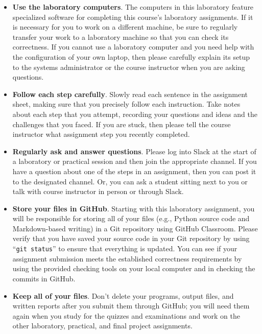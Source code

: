 \documentclass[11pt]{article}
\newcommand{\command}[1]{``\lstinline{#1}''}
\begin{document}
\begin{itemize}
  \setlength{\itemsep}{0pt}

\item {\bf Use the laboratory computers}. The computers in this laboratory feature specialized software for completing
  this course's laboratory  assignments. If it is necessary for you to work on a different machine, be sure to regularly
  transfer your work to a laboratory machine so that you can check its correctness. If you cannot use a laboratory
  computer and you need help with the configuration of your own laptop, then please carefully explain its setup to the
  systems administrator or the course instructor when you are asking questions.

\item {\bf Follow each step carefully}. Slowly read each sentence in the assignment sheet, making sure that you
  precisely follow each instruction. Take notes about each step that you attempt, recording your questions and ideas and
  the challenges that you faced. If you are stuck, then please tell the course instructor what assignment step you
  recently completed.

\item {\bf Regularly ask and answer questions}. Please log into Slack at the start of a laboratory or practical session
  and then join the appropriate channel. If you have a question about one of the steps in an assignment, then you can
  post it to the designated channel. Or, you can ask a student sitting next to you or talk with course instructor in
  person or through Slack.

\item {\bf Store your files in GitHub}. Starting with this laboratory assignment, you will be responsible for storing
  all of your files (e.g., Python source code and Markdown-based writing) in a Git repository using GitHub Classroom.
  Please verify that you have saved your source code in your Git repository by using \command{git status} to ensure that
  everything is updated. You can see if your assignment submission meets the established correctness requirements by
  using the provided checking tools on your local computer and in checking the commits in GitHub.

\item {\bf Keep all of your files}. Don't delete your programs, output files, and written reports after you submit them
  through GitHub; you will need them again when you study for the quizzes and examinations and work on the other
  laboratory, practical, and final project assignments.


\end{itemize}
\end{document}
